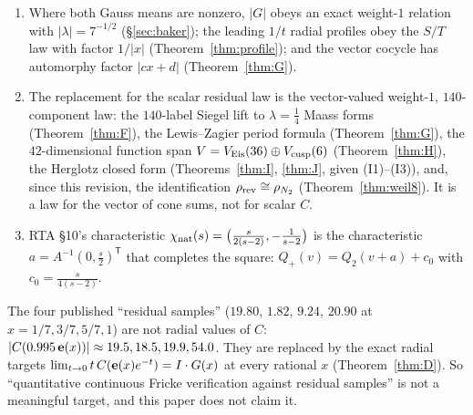 \begin{proposition}\label{prop:weight8}
\begin{enumerate}[label=(\roman*)]
\item Where both Gauss means are nonzero, $|G|$ obeys an exact weight-$1$ relation with $|\lambda|=7^{-1/2}$ (\S\ref{sec:baker}); the leading $1/t$ radial profiles obey the $S/T$ law with factor $1/|x|$ (Theorem~\ref{thm:profile}); and the vector cocycle has automorphy factor $|cx+d|$ (Theorem~\ref{thm:G}).
\item The replacement for the scalar residual law is the vector-valued weight-$1$, $140$-component law: the $140$-label Siegel lift to $\lambda=\tfrac14$ Maass forms (Theorem~\ref{thm:F}), the Lewis--Zagier period formula (Theorem~\ref{thm:G}), the $42$-dimensional function span $V=V_{\rm Eis}(36)\oplus V_{\rm cusp}(6)$ (Theorem~\ref{thm:H}), the Herglotz closed form (Theorems~\ref{thm:I}, \ref{thm:J}, given (I1)--(I3)), and, since this revision, the identification $\rho_{\rm rev}\cong\rho_{N_2}$ (Theorem~\ref{thm:weil8}). It is a law for the vector of cone sums, not for scalar $C$.
\item RTA \S10's characteristic $\chi_{\rm nat}(s)=\big(\tfrac s{2(s-2)},-\tfrac1{s-2}\big)$ is the characteristic $a=A^{-1}(0,\tfrac s2)^{\mathsf T}$ that completes the square: $Q_+(v)=Q_2(v+a)+c_0$ with $c_0=\tfrac s{4(s-2)}$.
\end{enumerate}
\end{proposition}

\begin{remark}\label{rem:samples8}
The four published ``residual samples'' ($19.80$, $1.82$, $9.24$, $20.90$ at $x=1/7,3/7,5/7,1$) are not radial values of $C$: $|C(0.995\,\mathbf{e}(x))|\approx19.5,18.5,19.9,54.0$. They are replaced by the exact radial targets $\lim_{t\to0}t\,C(\mathbf{e}(x)e^{-t})=I\cdot G(x)$ at every rational $x$ (Theorem~\ref{thm:D}). So ``quantitative continuous Fricke verification against residual samples'' is not a meaningful target, and this paper does not claim it.
\end{remark}

